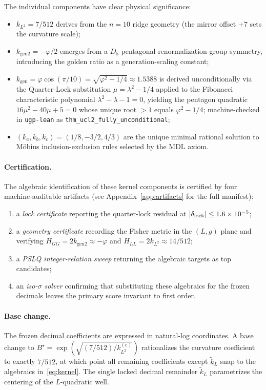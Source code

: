 \documentclass[11pt]{article}
\theoremstyle{remark}
\begin{document}
The individual components have clear physical significance:
\begin{itemize}[leftmargin=1.5em,itemsep=0.18em,topsep=0.2em]
  \item $k_{L^2} = 7/512$ derives from the $n{=}10$ ridge geometry (the mirror offset $+7$ sets the curvature scale);
  \item $k_{\mathrm{gen2}} = -\varphi/2$ emerges from a $D_5$ pentagonal renormalization-group symmetry, introducing the golden ratio as a generation-scaling constant;
  \item $k_{\mathrm{gen}} = \varphi\cos(\pi/10) = \sqrt{\varphi^2 - 1/4} \approx 1.5388$ is derived unconditionally via the Quarter-Lock substitution $\mu = \lambda^2 - 1/4$ applied to the Fibonacci characteristic polynomial $\lambda^2 - \lambda - 1 = 0$, yielding the pentagon quadratic $16\mu^2 - 40\mu + 5 = 0$ whose unique root $> 1$ equals $\varphi^2 - 1/4$; machine-checked in \texttt{ugp-lean} as \texttt{thm\_ucl2\_fully\_unconditional};
  \item $(k_a, k_b, k_c) = (1/8, -3/2, 4/3)$ are the unique minimal rational solution to M\"obius inclusion-exclusion rules selected by the MDL axiom.
\end{itemize}

\paragraph{Certification.}
The algebraic identification of these kernel components is certified by four machine-auditable artifacts (see Appendix~\ref{app:artifacts} for the full manifest):
\begin{enumerate}[leftmargin=1.6em,itemsep=0.15em,topsep=0.2em,label=(\roman*)]
  \item a \emph{lock certificate} reporting the quarter-lock residual at $|\delta_{\rm lock}| \le 1.6 \times 10^{-5}$;
  \item a \emph{geometry certificate} recording the Fisher metric in the $(L, g)$ plane and verifying $H_{GG} = 2k_{\mathrm{gen2}} \approx -\varphi$ and $H_{LL} = 2k_{L^2} \approx 14/512$;
  \item a \emph{PSLQ integer-relation sweep} returning the algebraic targets as top candidates;
  \item an \emph{iso-$\sigma$ solver} confirming that substituting these algebraics for the frozen decimals leaves the primary score invariant to first order.
\end{enumerate}

\paragraph{Base change.}
The frozen decimal coefficients are expressed in natural-log coordinates.
A base change to $B^\star = \exp(\sqrt{(7/512)/k_{L^2}^{(e)}})$ rationalizes the curvature coefficient to exactly $7/512$, at which point all remaining coefficients except $\tilde{k}_L$ snap to the algebraics in~\eqref{eq:kernel}.
The single locked decimal remainder $\tilde{k}_L$ parametrizes the centering of the $L$-quadratic well.
\end{document}
